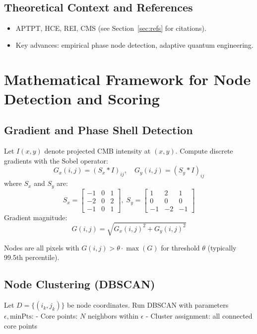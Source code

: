 \documentclass[12pt]{article}
\begin{document}
\subsection{Theoretical Context and References}
\begin{itemize}
  \item APTPT, HCE, REI, CMS (see Section~\ref{sec:refs} for citations).
  \item Key advances: empirical phase node detection, adaptive quantum engineering.
\end{itemize}

\newpage
\section{Mathematical Framework for Node Detection and Scoring}

\subsection{Gradient and Phase Shell Detection}

Let $I(x,y)$ denote projected CMB intensity at $(x,y)$.  
Compute discrete gradients with the Sobel operator:
\begin{equation}
G_{x}(i,j) = (S_x * I)_{ij}, \quad G_{y}(i,j) = (S_y * I)_{ij}
\end{equation}
where $S_x$ and $S_y$ are:
\[
S_x = \begin{bmatrix} -1 & 0 & 1\\ -2 & 0 & 2\\ -1 & 0 & 1 \end{bmatrix}, \;
S_y = \begin{bmatrix} 1 & 2 & 1\\ 0 & 0 & 0\\ -1 & -2 & -1 \end{bmatrix}
\]
Gradient magnitude:
\begin{equation}
G(i,j) = \sqrt{G_x(i,j)^2 + G_y(i,j)^2}
\end{equation}

Nodes are all pixels with $G(i,j) > \theta \cdot \max(G)$ for threshold $\theta$ (typically 99.5th percentile).

\subsection{Node Clustering (DBSCAN)}
Let $D = \{(i_k, j_k)\}$ be node coordinates.  
Run DBSCAN with parameters $\epsilon, \text{minPts}$:  
- Core points: $N$ neighbors within $\epsilon$
- Cluster assignment: all connected core points
\end{document}
